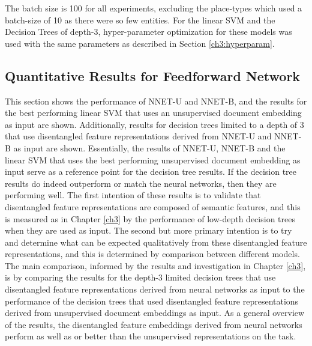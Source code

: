 The batch size is 100 for all experiments, excluding the place-types which used a batch-size of 10 as there were so few entities. For the linear SVM and the Decision Trees of depth-3, hyper-parameter optimization for these models was used with the same parameters as described in Section \ref{ch3:hyperparam}.


\subsection{Quantitative Results for Feedforward Network}

This section shows the performance  of NNET-U and NNET-B,  and the results for the best performing linear SVM that uses an unsupervised document embedding as input are shown. Additionally, results for decision trees limited to a depth of 3 that use disentangled feature representations derived from NNET-U and NNET-B as input are shown. Essentially, the results of NNET-U, NNET-B and the linear SVM that uses the best performing unsupervised document embedding as input serve as a reference point for the decision tree results. If the decision tree results do indeed outperform or match the neural networks, then they are performing well.  The first intention of these results is to validate that  disentangled feature representations are composed of semantic features, and this is measured as in Chapter \ref{ch3} by the performance of low-depth decision trees when they are used as input.  The second but more primary intention is to try and determine what can be expected qualitatively from these disentangled feature representations, and this is determined by comparison between different models. The main comparison, informed by the results and investigation in Chapter \ref{ch3}, is by comparing the results for the depth-3 limited decision trees that use  disentangled feature representations derived from neural networks as input to the performance of the decision trees that used disentangled feature representations derived from unsupervised document embeddings as input. %
As a general overview of the results,  the disentangled feature embeddings derived from neural networks perform as well as or better than the unsupervised representations on the task. 


